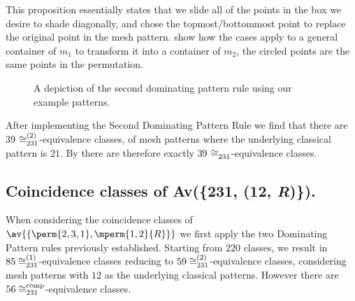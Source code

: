 This proposition essentially states that we slide all of the points in the box
we desire to shade diagonally, and chose the topmost/bottommost point to replace
the original point in the mesh pattern.  show how the cases
apply to a general container of \(m_1\) to transform it into a container of
\(m_2\), the circled points are the same points in the permutation.
\begin{figure}
\begin{center}
\raisebox{8ex}{\(\coinc{}\)}
\caption{A depiction of the second dominating pattern rule using our example patterns.}
\label{fig:d2}
\end{center}
\end{figure}

After implementing the Second Dominating Pattern Rule we find that there are
\(39\) \(\coinc[(2)]{231}\)-equivalence classes, of mesh patterns where the
underlying classical pattern is \(21\). By  there are
therefore exactly \(39\) \(\coinc{231}\)-equivalence classes.

\subsection{Coincidence classes of Av(\{231, (12, \textit{R})\}).}
When considering the coincidence classes of
\(\av{\{\perm{2,3,1},\mperm{1,2}{R}\}}\) we first apply the two Dominating
Pattern rules previously established. Starting from \(220\) classes, we result
in \(85 \coinc[(1)]{231}\)-equivalence classes reducing to \(59
\coinc[(2)]{231}\)-equivalence classes, considering mesh patterns with \(12\) as
the underlying classical patterns. However there are
\(56 \coinc[comp]{231}\)-equivalence classes.

